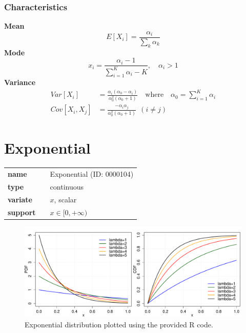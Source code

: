 \subsubsection*{Characteristics}
\smallskip \noindent \hspace{.2cm} \textbf{Mean} 
\begin{equation*}E[X_i] = \frac{\alpha_i}{\sum_k \alpha_k}\end{equation*}
\smallskip \noindent \hspace{.2cm} \textbf{Mode} 
\begin{equation*}x_i = \frac{\alpha_i - 1}{\sum_{i=1}^K\alpha_i - K}, \quad \alpha_i > 1\end{equation*}
\smallskip \noindent \hspace{.2cm} \textbf{Variance} 
\begin{align*}Var[X_i] &= \frac{\alpha_i (\alpha_0-\alpha_i)}{\alpha_0^2 (\alpha_0+1)} \quad \text{where} \quad \alpha_0 = \sum_{i=1}^K\alpha_i \\ Cov[X_i,X_j] & = \frac{- \alpha_i \alpha_j}{\alpha_0^2 (\alpha_0+1)}~~(i\neq j)\end{align*}
\smallskip
\section*{Exponential} 

  \bigskip 

\begin{tabular}{p{2cm}cl}
\textbf{name} & & Exponential (ID: 0000104)\\ 
 
\textbf{type} & & continuous \\ 

\textbf{variate} & & $x$, scalar \\ 

\textbf{support} & & $x \in [0,+\infty)$
\end{tabular}

\begin{figure}[ht!]
\centering
  \includegraphics[width=140mm]{pics/Exponential.pdf}
 \caption{Exponential distribution plotted using the provided R code.}
 \label{fig:Exponential}
\end{figure}

